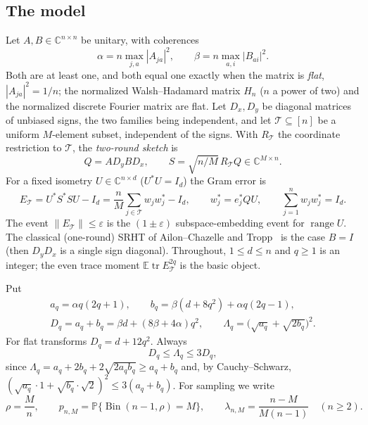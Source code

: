 \documentclass[11pt,a4paper]{article}
\theoremstyle{definition}
\theoremstyle{remark}
\numberwithin{equation}{section}
\newcommand{\E}{\mathbb E}
\newcommand{\Prob}{\mathbb P}
\newcommand{\C}{\mathbb C}
\newcommand{\tr}{\operatorname{tr}}
\newcommand{\range}{\operatorname{range}}
\newcommand{\Bin}{\operatorname{Bin}}
\newcommand{\eps}{\varepsilon}
\newcommand{\norm}[1]{\lVert#1\rVert}
\newcommand{\cT}{\mathcal T}
\begin{document}
\subsection{The model}\label{sec:model}
Let $A,B\in\C^{n\times n}$ be unitary, with coherences
\begin{equation}\label{eq:coherence}
 \alpha=n\max_{j,a}|A_{ja}|^2,\qquad \beta=n\max_{a,i}|B_{ai}|^2 .
\end{equation}
Both are at least one, and both equal one exactly when the matrix is
\emph{flat}, $|A_{ja}|^2=1/n$; the normalized Walsh--Hadamard matrix
$H_n$ ($n$ a power of two) and the normalized discrete Fourier matrix are
flat. Let $D_x,D_y$ be diagonal matrices of unbiased signs, the two
families being independent, and let $\cT\subseteq[n]$ be a uniform
$M$-element subset, independent of the signs. With $R_\cT$ the coordinate
restriction to $\cT$, the \emph{two-round sketch} is
\begin{equation}\label{eq:sketch}
 Q=AD_yBD_x,\qquad S=\sqrt{n/M}\,R_\cT Q\in\C^{M\times n}.
\end{equation}
For a fixed isometry $U\in\C^{n\times d}$ ($U^*U=I_d$) the Gram error is
\[
 E_\cT=U^*S^*SU-I_d=\frac nM\sum_{j\in\cT}w_jw_j^*-I_d,
 \qquad w_j^*=e_j^*QU,\qquad \sum_{j=1}^nw_jw_j^*=I_d .
\]
The event $\norm{E_\cT}\le\eps$ is the $(1\pm\eps)$ subspace-embedding
event for $\range U$. The classical (one-round) SRHT of
Ailon--Chazelle and Tropp~\cite{AilonChazelle,TroppSRHT} is the case
$B=I$ (then $D_yD_x$ is a single sign diagonal). Throughout, $1\le d\le n$
and $q\ge1$ is an integer; the even trace moment $\E\tr E_\cT^{2q}$ is the
basic object.

Put
\begin{equation}\label{eq:allowances}
\begin{gathered}
 a_q=\alpha q(2q+1),\qquad b_q=\beta(d+8q^2)+\alpha q(2q-1),\\
 D_q=a_q+b_q=\beta d+(8\beta+4\alpha)q^2,\qquad
 \Lambda_q=\bigl(\sqrt{a_q}+\sqrt{2b_q}\bigr)^2 .
\end{gathered}
\end{equation}
For flat transforms $D_q=d+12q^2$. Always
\begin{equation}\label{eq:LambdaD}
 D_q\le\Lambda_q\le3D_q,
\end{equation}
since $\Lambda_q=a_q+2b_q+2\sqrt{2a_qb_q}\ge a_q+b_q$ and, by
Cauchy--Schwarz, $(\sqrt{a_q}\cdot1+\sqrt{b_q}\cdot\sqrt2)^2\le3(a_q+b_q)$.
For sampling we write
\begin{equation}\label{eq:rho-atom}
 \rho=\frac Mn,\qquad
 p_{n,M}=\Prob\{\Bin(n-1,\rho)=M\},\qquad
 \lambda_{n,M}=\frac{n-M}{M(n-1)}\quad(n\ge2).
\end{equation}
\end{document}
